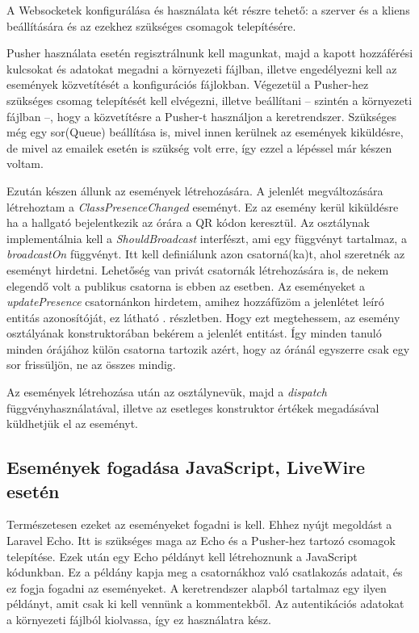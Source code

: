 \documentclass[
]{thesis-ekf}
\theoremstyle{definition}
\theoremstyle{remark}
\begin{document}
A Websocketek konfigurálása és használata két részre tehető: a szerver és a kliens beállítására és az ezekhez szükséges csomagok telepítésére.

Pusher használata esetén regisztrálnunk kell magunkat, majd a kapott hozzáférési kulcsokat és adatokat megadni a környezeti fájlban, illetve engedélyezni kell az események közvetítését a konfigurációs fájlokban. Végezetül a Pusher-hez szükséges csomag telepítését kell elvégezni, illetve beállítani -- szintén a környezeti fájlban --, hogy a közvetítésre a Pusher-t használjon a keretrendszer. Szükséges még egy sor(Queue) beállítása is, mivel innen kerülnek az események kiküldésre, de mivel az emailek esetén is szükség volt erre, így ezzel a lépéssel már készen voltam.\cite{broadcasting}

Ezután készen állunk az események létrehozására. A jelenlét megváltozására létrehoztam a \emph{ClassPresenceChanged} eseményt. Ez az esemény kerül kiküldésre ha a hallgató bejelentkezik az órára a QR kódon keresztül. Az osztálynak implementálnia kell a \emph{ShouldBroadcast} interfészt, ami egy függvényt tartalmaz, a \emph{broadcastOn} függvényt. Itt kell definiálunk azon csatorná(ka)t, ahol szeretnék az eseményt hirdetni. Lehetőség van privát csatornák létrehozására is, de nekem elegendő volt a publikus csatorna is ebben az esetben. Az eseményeket a \emph{updatePresence} csatornánkon hirdetem, amihez hozzáfűzöm a jelenlétet leíró entitás azonosítóját, ez látható . részletben. Hogy ezt megtehessem, az esemény osztályának konstruktorában bekérem a jelenlét entitást. Így minden tanuló minden órájához külön csatorna tartozik azért, hogy az óránál egyszerre csak egy sor frissüljön, ne az összes mindig.
\pagebreak



Az események létrehozása után az osztálynevük, majd a \emph{dispatch} függvényhasználatával, illetve az esetleges konstruktor értékek megadásával küldhetjük el az eseményt.



\subsection{Események fogadása JavaScript, LiveWire esetén}

Természetesen ezeket az eseményeket fogadni is kell. Ehhez nyújt megoldást a Laravel Echo\cite{broadcasting}. Itt is szükséges maga az Echo és a Pusher-hez tartozó csomagok telepítése. Ezek után egy Echo példányt kell létrehoznunk a JavaScript kódunkban. Ez a példány kapja meg a csatornákhoz való csatlakozás adatait, és ez fogja fogadni az eseményeket. A keretrendszer alapból tartalmaz egy ilyen példányt, amit csak ki kell vennünk a  kommentekből. Az autentikációs adatokat a környezeti fájlból kiolvassa, így ez használatra kész.
\end{document}
